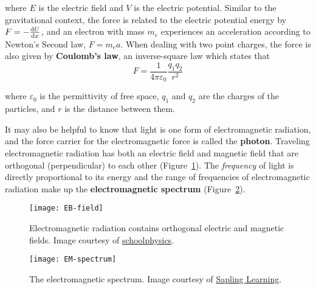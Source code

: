 where $E$ is the electric field and $V$ is the electric potential. Similar to the gravitational context, the force is related to the electric potential energy by $F = -\dv{U}{x}$, and an electron with mass $m_e$ experiences an acceleration according to Newton's Second law, $F = m_ea$. When dealing with two point charges, the force is also given by \textbf{Coulomb's law}, an inverse-square law which states that
\begin{equation*}
	F = \frac{1}{4\pi \varepsilon_0} \frac{q_1q_2}{r^2}
\end{equation*}

where $\varepsilon_0$ is the permittivity of free space, $q_1$ and $q_2$ are the charges of the particles, and $r$ is the distance between them. \par 

It may also be helpful to know that light is one form of electromagnetic radiation, and the force carrier for the electromagnetic force is called the \textbf{photon}. Traveling electromagnetic radiation has both an electric field and magnetic field that are orthogonal (perpendicular) to each other (Figure~\ref{fig:EB-field}). The \emph{frequency} of light is directly proportional to its energy and the range of frequencies of electromagnetic radiation make up the \textbf{electromagnetic spectrum} (Figure~\ref{fig:EM-spec}).

\begin{figure}[!h]
	\centering
	\texttt{[image: EB-field]}
	\caption{Electromagnetic radiation contains orthogonal electric and magnetic fields. Image courtesy of \href{http://www.schoolphysics.co.uk/age16-19/Wave\%20properties/Polarisation/text/Polarisation_/images/2.png}{schoolphysics}.}
	\label{fig:EB-field}
\end{figure}

\begin{figure}[!h]
	\centering
	\texttt{[image: EM-spectrum]}
	\caption{The electromagnetic spectrum. Image courtesy of \href{https://sites.google.com/site/chempendix/em-spectrum}{Sapling Learning}.}
	\label{fig:EM-spec}
\end{figure}

%